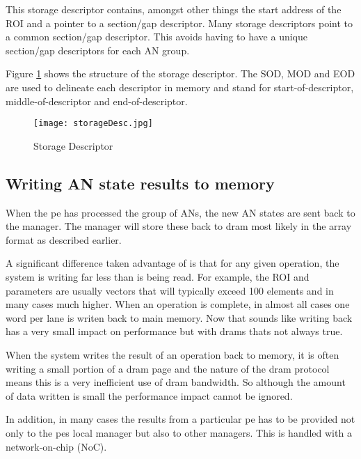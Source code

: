 This storage descriptor contains, amongst other things the start address of the ROI and a pointer to a section/gap descriptor. Many storage descriptors point to a common section/gap descriptor. This avoids having to have a unique section/gap descriptors for each AN group.

Figure \ref{fig:storageDescriptor} shows the structure of the storage descriptor. The SOD, MOD and EOD are used to delineate each descriptor in memory and stand for start-of-descriptor, middle-of-descriptor and end-of-descriptor.

\begin{figure}[!t]
\centering
\captionsetup{justification=centering}
\captionsetup{width=.9\linewidth}
\centerline{
\mbox{\texttt{[image: storageDesc.jpg]}}
}
\caption{Storage Descriptor}
\label{fig:storageDescriptor}
\end{figure}

\subsection{Writing AN state results to memory}
\label{sec:writingANStates}

When the \ac{pe} has processed the group of ANs, the new AN states are sent back to the manager. The manager will store these back to \ac{dram} most likely in the array format as described earlier.

A significant difference taken advantage of is that for any given operation, the system is writing far less than is being read. For example, the ROI and parameters are usually vectors that will typically exceed 100 elements and in many cases much higher. When an operation is complete, in almost all cases one word per lane is writen back to main memory. 
Now that sounds like writing back has a very small impact on performance but with \ac{dram}s thats not always true.

When the system writes the result of an operation back to memory, it is often writing a small portion of a \ac{dram} page and the nature of the \ac{dram} protocol means this is a very inefficient use of \ac{dram} bandwidth. So although the amount of data written is small the performance impact cannot be ignored.

In addition, in many cases the results from a particular \ac{pe} has to be provided not only to the \ac{pe}s local manager but also to other managers. This is handled with a network-on-chip (NoC).

